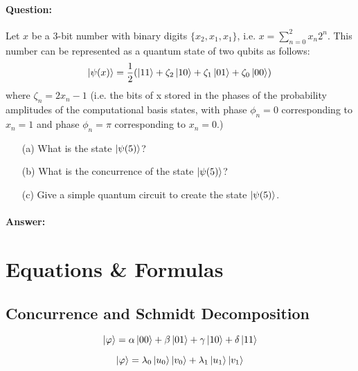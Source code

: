 \documentclass[reprint, amsmath,amssymb, aps]{revtex4-2}
\begin{document}
            \paragraph{Question:} Let $x$ be a 3-bit number with binary digits $\{x_2, x_1, x_1\}$, i.e. $x =\sum\limits_{n=0}^{2}x_n2^n$. This number can be represented as a quantum state of two qubits as follows: 
            \begin{equation*}
                \ket{\psi(x)} = \frac{1}{2}(\ket{11}+\zeta_2\ket{10}+\zeta_1\ket{01}+\zeta_0\ket{00})
            \end{equation*}
            where $\zeta_n = 2x_n - 1$ (i.e. the bits of x stored in the phases of the probability amplitudes of the computational basis states, with phase $\phi_n = 0$ corresponding to $x_n = 1$ and phase $\phi_n = \pi$ corresponding to $x_n = 0$.)
            \begin{itemize}
                \item[(a)] What is the state $\ket{\psi(5)}$?
                \item[(b)] What is the concurrence of the state $\ket{\psi(5)}$?
                \item[(c)] Give a simple quantum circuit to create the state $\ket{\psi(5)}$.
            \end{itemize}
            \begin{mdframed}
                \paragraph{Answer:}
            \end{mdframed}
        

    \section{Equations \& Formulas}
        \subsection{Concurrence and Schmidt Decomposition}
        \begin{equation} \label{eqn:state-general}
            \ket{\varphi} = \alpha\ket{00} + \beta\ket{01} + \gamma\ket{10} + \delta\ket{11}
        \end{equation}

        \begin{equation*} \label{eqn:state-schmidt}
            \ket{\varphi} = \lambda_0\ket{u_0}\ket{v_0} + \lambda_1\ket{u_1}\ket{v_1}
        \end{equation*}
        
\end{document}

